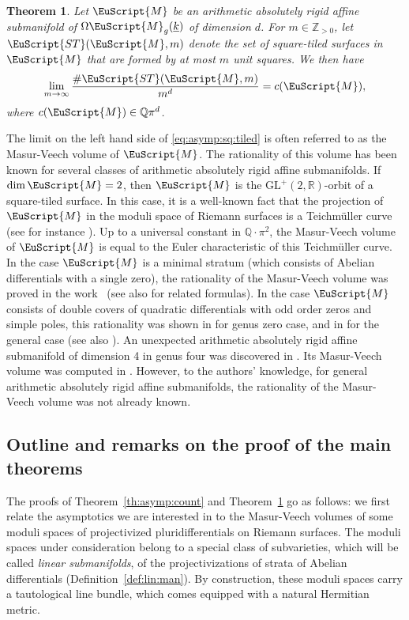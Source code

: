 \documentclass[JEP,XML,SOM,Unicode]{cedram}
\let\mathcal\EuScript
\theoremstyle{plain}
\newtheorem{Theorem}{Theorem}[section]
\theoremstyle{definition}
\newcommand{\R}{\mathbb{R}}
\newcommand\Z{\mathbb{Z}}
\newcommand{\Q}{\mathbb{Q}}
\newcommand{\Mcal}{\mathcal{M}}
\newcommand{\cM}{\mathcal{M}}
\newcommand{\ST}{\mathcal{ST}}
\newcommand{\GL}{\mathrm{GL}}
\let\ul\underline
\newcommand{\trate}{\Omega\Mcal_{g}(\ul{k})}
\begin{document}
\begin{Theorem}\label{th:aff:subman:count}
Let $\Mcal$ be an \emph{arithmetic absolutely rigid} affine submanifold of $\trate$ of dimension $d$. For $m\in \Z_{>0}$, let $\ST(\Mcal,m)$ denote the set of square-tiled surfaces in $\Mcal$ that are formed by at most $m$ unit squares. We then have
\begin{equation}\label{eq:asymp:sq:tiled}
\lim_{m \to \infty}\frac{\#\ST(\Mcal,m)}{m^{d}}=c(\Mcal),
\end{equation}
where $c(\Mcal) \in \Q\pi^{d}$.
\end{Theorem}
The limit on the left hand side of \eqref{eq:asymp:sq:tiled} is often referred to as the Masur-Veech volume of $\cM$.
The rationality of this volume has been known for several classes of arithmetic absolutely rigid affine submanifolds.
If $\dim \cM=2$, then $\cM$ is the $\GL^+(2,\R)$\nobreakdash-orbit of a square-tiled surface. In this case, it is a well-known fact that the projection of $\cM$ in the moduli space of Riemann surfaces is a Teichmüller curve (see for instance \cite{SW04}). Up to a universal constant in $\Q\cdot\pi^2$, the Masur-Veech volume of $\cM$ is equal to the Euler characteristic of this Teichmüller curve.
In the case $\cM$ is a minimal stratum (which consists of Abelian differentials with a single zero), the rationality of the Masur-Veech volume was proved in the work~\cite{EO01} (see also \cite{Sau18} for related formulas). In the case $\cM$ consists of double covers of quadratic differentials with odd order zeros and simple poles, this rationality was shown in \cite{AEZ16} for genus zero case, and in \cite{CMS19} for the general case (see also \cite{EO06,Goujard}).
An unexpected arithmetic absolutely rigid affine submanifold of dimension 4 in genus four was discovered in \cite{MMW17}.
Its Masur-Veech volume was computed in \cite{TT19}.
However, to the authors' knowledge, for general arithmetic absolutely rigid affine submanifolds, the rationality of the Masur-Veech volume was not already known.

\subsection{Outline and remarks on the proof of the main theorems}\label{subsec:outline}
The proofs of Theorem~\ref{th:asymp:count} and Theorem~\ref{th:aff:subman:count} go as follows: we first relate the asymptotics we are interested in to the Masur-Veech volumes of some moduli spaces of projectivized pluri\-differentials on Riemann surfaces. The moduli spaces under consideration belong to a special class of subvarieties, which will be called \emph{linear submanifolds}, of the projectivizations of strata of Abelian differentials (\cf Definition~\ref{def:lin:man}). By construction, these moduli spaces carry a tautological line bundle, which comes equipped with a natural Hermitian metric.
\end{document}
